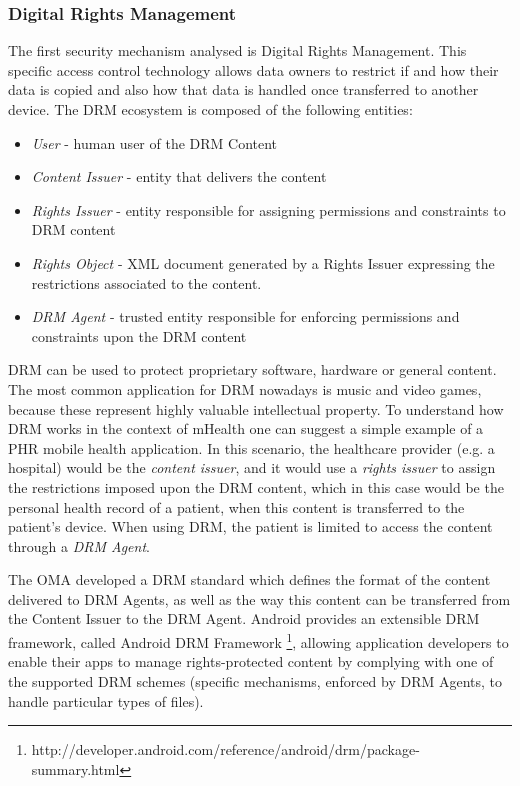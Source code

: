\subsubsection{Digital Rights Management}
The first security mechanism analysed is Digital Rights Management. This specific access control technology allows data owners to restrict if and how their data is copied and also how that data is handled once transferred to another device. The \ac{DRM} ecosystem is composed of the following entities:

\begin{itemize}
	\item \emph{User} - human user of the DRM Content
	\item \emph{Content Issuer} - entity that delivers the content
	\item \emph{Rights Issuer} - entity responsible for assigning permissions and constraints to \ac{DRM} content
	\item \emph{Rights Object} - XML document generated by a Rights Issuer expressing the restrictions associated to the content.
	\item \emph{\ac{DRM} Agent} - trusted entity responsible for enforcing permissions and constraints upon the \ac{DRM} content
\end{itemize}

\ac{DRM} can be used to protect proprietary software, hardware or general content. The most common application for \ac{DRM} nowadays is music and video games, because these represent highly valuable intellectual property. To understand how \ac{DRM} works in the context of mHealth one can suggest a simple example of a \ac{PHR} mobile health application. In this scenario, the healthcare provider (e.g. a hospital) would be the \emph{content issuer}, and it would use a \emph{rights issuer} to assign the restrictions imposed upon the \ac{DRM} content, which in this case would be the personal health record of a patient, when this content is transferred to the patient's device. When using \ac{DRM}, the patient is limited to access the content through a \emph{\ac{DRM} Agent}.

The \ac{OMA} developed a DRM standard \cite{drm} which defines the format of the content delivered to DRM Agents, as well as the way this content can be transferred from the Content Issuer to the DRM Agent. Android provides an extensible DRM framework, called Android DRM Framework \footnote{http://developer.android.com/reference/android/drm/package-summary.html}, allowing application developers to enable their apps to manage rights-protected content by complying with one of the supported DRM schemes (specific mechanisms, enforced by DRM Agents, to handle particular types of files).


